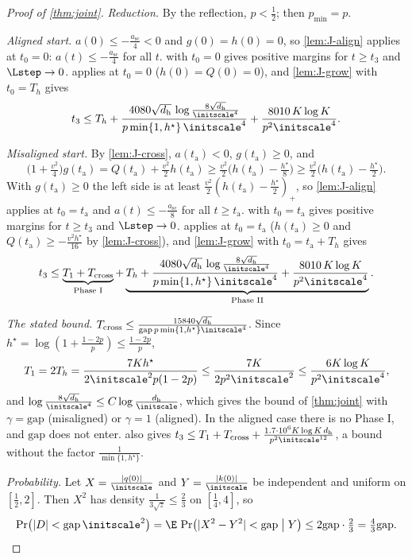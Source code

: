 \begin{proof}[Proof of \cref{thm:joint}]
\emph{Reduction.} By the reflection, $p<\frac{1}{2}$; then $p_{\min}=p$.

\emph{Aligned start.} $a(0)\le-\frac{a_{\mathrm{sc}}}{4}<0$ and $g(0)=h(0)=0$, so \cref{lem:J-align} applies at $t_0=0$: $a(t)\le-\frac{a_{\mathrm{sc}}}{4}$ for all $t$.
 with $t_0=0$ gives positive margins for $t\ge t_3$ and $\Lstep\to0$.  applies at $t_0=0$ ($h(0)=Q(0)=0$), and
\cref{lem:J-grow} with $t_0=T_h$ gives
\[
 t_3\le T_h+\frac{4080\sqrt{d_{\mathrm h}}\,\log\frac{8\sqrt{d_{\mathrm h}}}{\initscale^4}}{p\min\{1,h^\star\}\,\initscale^4}+\frac{8010\,K\log K}{p^2\initscale^4} .
\]

\emph{Misaligned start.} By \cref{lem:J-cross}, $a(t_{\mathrm a})<0$, $g(t_{\mathrm a})\ge0$, and
\[
 \bigl(1+\tfrac{v^2}{4}\bigr)g(t_{\mathrm a})=Q(t_{\mathrm a})+\tfrac{v^2}{2}h(t_{\mathrm a})\ge\tfrac{v^2}{2}\bigl(h(t_{\mathrm a})-\tfrac{h^\star}{8}\bigr)\ge\tfrac{v^2}{2}\bigl(h(t_{\mathrm a})-\tfrac{h^\star}{2}\bigr).
\]
With $g(t_{\mathrm a})\ge0$ the left side is at least $\frac{v^2}{2}(h(t_{\mathrm a})-\frac{h^\star}{2})_+$, so \cref{lem:J-align} applies at $t_0=t_{\mathrm a}$ and $a(t)\le-\frac{a_{\mathrm{sc}}}{8}$ for all $t\ge t_{\mathrm a}$.  with $t_0=t_{\mathrm a}$ gives positive margins for $t\ge t_3$ and $\Lstep\to0$. 
applies at $t_0=t_{\mathrm a}$ ($h(t_{\mathrm a})\ge0$ and $Q(t_{\mathrm a})\ge-\frac{v^2h^\star}{16}$ by \cref{lem:J-cross}), and \cref{lem:J-grow} with $t_0=t_{\mathrm a}+T_h$ gives
\[
 t_3\le\underbrace{T_1+T_{\mathrm{cross}}}_{\text{Phase I}}+\underbrace{T_h+\frac{4080\sqrt{d_{\mathrm h}}\,\log\frac{8\sqrt{d_{\mathrm h}}}{\initscale^4}}{p\min\{1,h^\star\}\,\initscale^4}+\frac{8010\,K\log K}{p^2\initscale^4}}_{\text{Phase II}} .
\]

\emph{The stated bound.} $T_{\mathrm{cross}}\le\frac{15840\sqrt{d_{\mathrm h}}}{\mathrm{gap}\,p\min\{1,h^\star\}\initscale^4}$. Since $h^\star=\log(1+\frac{1-2p}{p})\le\frac{1-2p}{p}$,
\[
 T_1=2T_h=\frac{7Kh^\star}{2\initscale^2p(1-2p)}\le\frac{7K}{2p^2\initscale^2}\le\frac{6K\log K}{p^2\initscale^4},
\]
and $\log\frac{8\sqrt{d_{\mathrm h}}}{\initscale^4}\le C\log\frac{d_{\mathrm h}}{\initscale}$, which gives the bound of \cref{thm:joint} with $\gamma=\mathrm{gap}$ (misaligned) or $\gamma=1$ (aligned). In the
aligned case there is no Phase I, and $\mathrm{gap}$ does not enter.  also gives $t_3\le T_1+T_{\mathrm{cross}}+\frac{1.7\cdot10^6K\log K\,d_{\mathrm h}}{p^2\initscale^{12}}$, a bound
without the factor $\frac{1}{\min\{1,h^\star\}}$.

\emph{Probability.} Let $X=\frac{|q(0)|}{\initscale}$ and $Y=\frac{|k(0)|}{\initscale}$ be independent and uniform on $[\frac{1}{2},2]$. Then $X^2$ has density
$\frac{1}{3\sqrt z}\le\frac{2}{3}$ on $[\frac{1}{4},4]$, so
\[
 \Pr\bigl(|D|<\mathrm{gap}\,\initscale^2\bigr)=\E\,\Pr\bigl(|X^2-Y^2|<\mathrm{gap}\bigm|Y\bigr)\le2\mathrm{gap}\cdot\tfrac{2}{3}=\tfrac{4}{3}\mathrm{gap} .\qedhere
\]
\end{proof}

